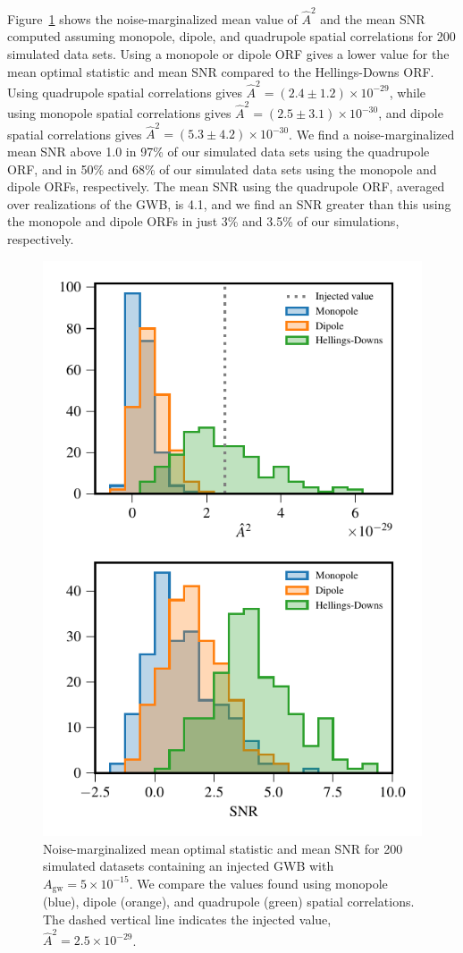 \documentclass[twocolumn,aps,prd,superscriptaddress]{revtex4-1}
\newcommand{\Agw}{\ensuremath{A_\mathrm{gw}}}
\begin{document}
Figure~\ref{fig:os_ORF} shows the noise-marginalized 
mean value of $\hat{A}^2$ and the mean SNR 
computed assuming monopole, dipole, and quadrupole spatial correlations 
for 200 simulated data sets. Using a monopole or dipole ORF 
gives a lower value for the mean optimal statistic and mean SNR compared to the 
Hellings-Downs ORF. 
Using quadrupole spatial correlations gives $\hat{A}^2 = (2.4 \pm 1.2) \times 10^{-29}$, 
while using monopole spatial correlations gives $\hat{A}^2 = (2.5 \pm 3.1) \times 10^{-30}$, 
and dipole spatial correlations gives $\hat{A}^2 = (5.3 \pm 4.2) \times 10^{-30}$. 
We find a noise-marginalized mean SNR above 1.0 in 97\% of our simulated data sets 
using the quadrupole ORF, and in 50\% and 68\% of our simulated data sets 
using the monopole and dipole ORFs, respectively. 
The mean SNR using the quadrupole ORF, averaged over realizations of the GWB, is 4.1, 
and we find an SNR greater than this using the monopole and dipole ORFs in just 
3\% and 3.5\% of our simulations, respectively.
\begin{figure}[t]
	\includegraphics[width=0.95\columnwidth]{plots/optstat_spatial_A5e-15.pdf}
	\caption{Noise-marginalized mean optimal statistic and mean SNR for 200 simulated datasets 
			containing an injected GWB with $\Agw = 5\times10^{-15}$. 
			We compare the values found using monopole (blue), dipole (orange), 
			and quadrupole (green) spatial correlations. 
			The dashed vertical line indicates the injected value, $\hat{A}^2 = 2.5 \times 10^{-29}$.}
	\label{fig:os_ORF}
\end{figure}
\end{document}
